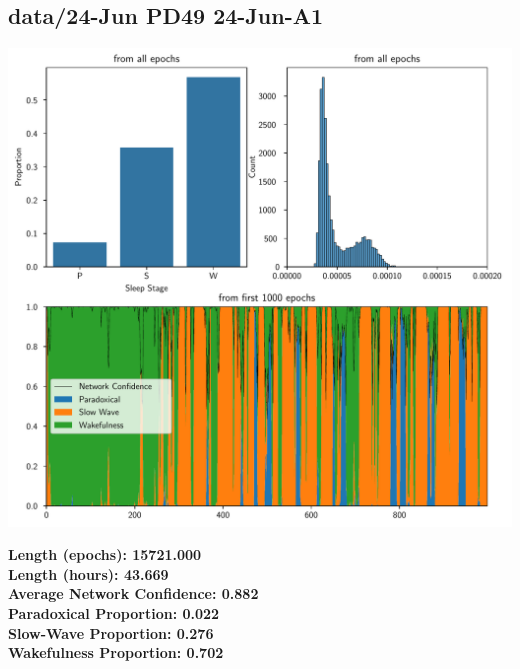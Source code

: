         \subsection*{ data/24-Jun PD49 24-Jun-A1 }
        \begin{center}
        \begin{adjustbox}{width=1\textwidth}
        \includegraphics[page=2]{figs.pdf}
        \end{adjustbox}
        \end{center}
        \large\textbf{Length (epochs): 15721.000}\\
        \textbf{Length (hours): 43.669}\\
        \textbf{Average Network Confidence: 0.882}\\
        \textbf{Paradoxical Proportion: 0.022}\\
        \textbf{Slow-Wave Proportion: 0.276}\\
        \textbf{Wakefulness Proportion: 0.702}\\
        

